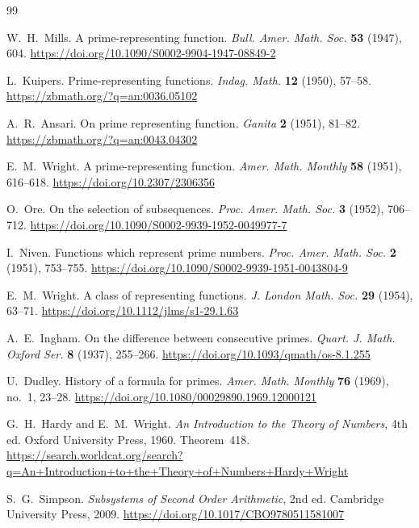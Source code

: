 \documentclass[11pt,reqno]{amsart}
\theoremstyle{blueplain}
\numberwithin{equation}{section}
\begin{document}
\newpage
\begin{thebibliography}{99}
	
	W.~H.~Mills.
	A prime-representing function.
	\emph{Bull. Amer. Math. Soc.} \textbf{53} (1947), 604.
	\url{https://doi.org/10.1090/S0002-9904-1947-08849-2}
	
	L.~Kuipers.
	Prime-representing functions.
	\emph{Indag. Math.} \textbf{12} (1950), 57--58.
	\url{https://zbmath.org/?q=an:0036.05102}
	
	A.~R.~Ansari.
	On prime representing function.
	\emph{Ganita} \textbf{2} (1951), 81--82.
	\url{https://zbmath.org/?q=an:0043.04302}
	
	E.~M.~Wright.
	A prime-representing function.
	\emph{Amer. Math. Monthly} \textbf{58} (1951), 616--618.
	\url{https://doi.org/10.2307/2306356}
	
	O.~Ore.
	On the selection of subsequences.
	\emph{Proc. Amer. Math. Soc.} \textbf{3} (1952), 706--712.
	\url{https://doi.org/10.1090/S0002-9939-1952-0049977-7}
	
	I.~Niven.
	Functions which represent prime numbers.
	\emph{Proc. Amer. Math. Soc.} \textbf{2} (1951), 753--755.
	\url{https://doi.org/10.1090/S0002-9939-1951-0043804-9}
	
	E.~M.~Wright.
	A class of representing functions.
	\emph{J. London Math. Soc.} \textbf{29} (1954), 63--71.
	\url{https://doi.org/10.1112/jlms/s1-29.1.63}
	
	A.~E.~Ingham.
	On the difference between consecutive primes.
	\emph{Quart. J. Math. Oxford Ser.} \textbf{8} (1937), 255--266.
	\url{https://doi.org/10.1093/qmath/os-8.1.255}
	
	U.~Dudley.
	History of a formula for primes.
	\emph{Amer. Math. Monthly} \textbf{76} (1969), no.~1, 23--28.
	\url{https://doi.org/10.1080/00029890.1969.12000121}
	
	G.~H.~Hardy and E.~M.~Wright.
	\emph{An Introduction to the Theory of Numbers}, 4th ed.
	Oxford University Press, 1960. Theorem~418.
	\url{https://search.worldcat.org/search?q=An+Introduction+to+the+Theory+of+Numbers+Hardy+Wright}
	
	S.~G.~Simpson.
	\emph{Subsystems of Second Order Arithmetic}, 2nd ed.
	Cambridge University Press, 2009.
	\url{https://doi.org/10.1017/CBO9780511581007}
	

\end{thebibliography}
\end{document}
